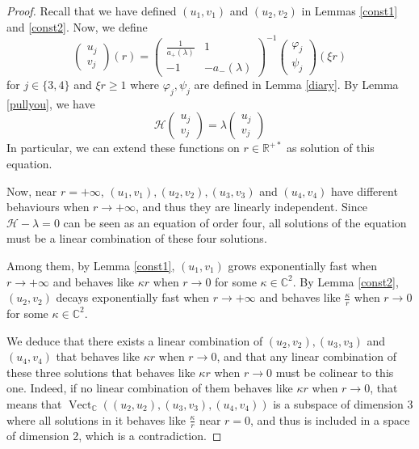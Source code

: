 \documentclass[11 pt]{amsart}
\newcommand{\tmop}[1]{\ensuremath{\operatorname{#1}}}
\theoremstyle{definition}
\theoremstyle{remark}
\numberwithin{equation}{section}
\begin{document}
\begin{proof}
  Recall that we have defined $(u_1, v_1)$ and $(u_2, v_2)$ in Lemmas
  \ref{const1} and \ref{const2}. Now, we define
  \[ \left(\begin{array}{c}
       u_j\\
       v_j
     \end{array}\right) (r) = \left(\begin{array}{cc}
       \frac{1}{a_+ (\lambda)} & 1\\
       - 1 & - a_- (\lambda)
     \end{array}\right)^{- 1} \left(\begin{array}{c}
       \varphi_j\\
       \psi_j
     \end{array}\right) (\xi r) \]
  for $j \in \{ 3, 4 \}$ and $\xi r \geqslant 1$ where $\varphi_j, \psi_j$
  are defined in Lemma \ref{diary}. By Lemma \ref{pullyou}, we have
  \[ \mathcal{H} \left(\begin{array}{c}
       u_j\\
       v_j
     \end{array}\right) = \lambda \left(\begin{array}{c}
       u_j\\
       v_j
     \end{array}\right) \]
  In particular, we can extend these functions on $r \in \mathbb{R}^{+ \ast}$
  as solution of this equation.
  
  Now, near $r = + \infty$, $(u_1, v_1), (u_2, v_2), (u_3, v_3)$ and
  $(u_4, v_4)$ have different behaviours when $r \rightarrow + \infty$, and
  thus they are linearly independent. Since $\mathcal{H}- \lambda = 0$ can be
  seen as an equation of order four, all solutions of the equation must be a
  linear combination of these four solutions.
  
  Among them, by Lemma \ref{const1}, $(u_1, v_1)$ grows exponentially fast
  when $r \rightarrow + \infty$ and behaves like $\kappa r$ when $r
  \rightarrow 0$ for some $\kappa \in \mathbb{C}^2$. By Lemma \ref{const2},
  $(u_2, v_2)$ decays exponentially fast when $r \rightarrow + \infty$ and
  behaves like $\frac{\kappa}{r}$ when $r \rightarrow 0$ for some $\kappa \in
  \mathbb{C}^2$.
  
  We deduce that there exists a linear combination of $(u_2, v_2), (u_3, v_3)$
  and $(u_4, v_4)$ that behaves like $\kappa r$ when $r \rightarrow 0$, and
  that any linear combination of these three solutions that behaves like
  $\kappa r$ when $r \rightarrow 0$ must be colinear to this one. Indeed, if
  no linear combination of them behaves like $\kappa r$ when $r \rightarrow
  0$, that means that $\tmop{Vect}_{\mathbb{C}} ((u_2, u_2), (u_3, v_3), (u_4,
  v_4))$ is a subspace of dimension 3 where all solutions in it behaves like
  $\frac{\kappa}{r}$ near $r = 0$, and thus is included in a space of
  dimension 2, which is a contradiction.
  

\end{proof}
\end{document}

